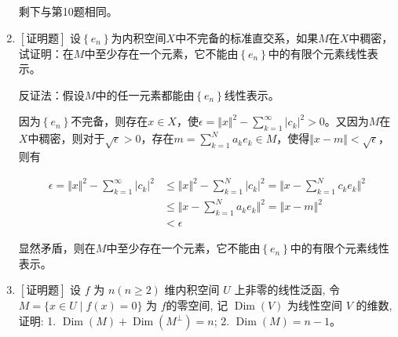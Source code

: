 \documentclass{article}
\begin{document}
\begin{enumerate}
    剩下与第10题相同。

    \item $\left[\textbf{证明题}\right]$ 设$\left\{e_n\right\}$为内积空间$X$中不完备的标准直交系，如果$M$在$X$中稠密，试证明：在$M$中至少存在一个元素，它不能由$\left\{e_n\right\}$中的有限个元素线性表示。

    反证法：假设$M$中的任一元素都能由$\left\{e_n\right\}$线性表示。

    因为$\left\{e_n\right\}$不完备，则存在$x \in X$，使$\epsilon = \Vert x \Vert ^ 2 - \sum_{k=1}^{\infty} \left|c_k\right|^2 > 0$。又因为$M$在$X$中稠密，则对于$\sqrt{\epsilon} > 0$，存在$m=\sum_{k=1}^{N} a_ke_k \in M$，使得$\Vert x - m\Vert < \sqrt{\epsilon}$，则有

    \begin{equation*}
        \begin{aligned}
            \epsilon = \Vert x \Vert ^ 2 - \sum_{k=1}^{\infty} \left|c_k\right|^2 & \leq \Vert x \Vert ^ 2 - \sum_{k=1}^{N} \left|c_k\right|^2 = \Vert x- \sum_{k=1}^{N}c_k e_k \Vert ^ 2 \\ &\leq \Vert x- \sum_{k=1}^{N}a_k e_k \Vert ^ 2 = \Vert x- m \Vert ^ 2 \\
            &< \epsilon
        \end{aligned}
    \end{equation*}

显然矛盾，则在$M$中至少存在一个元素，它不能由$\left\{e_n\right\}$中的有限个元素线性表示。

\item $\left[\textbf{证明题}\right]$ 设 $f$ 为 $n(n \geq 2)$ 维内积空间 $U$ 上非零的线性泛函, 令 $M=\{x \in U \mid f(x)=0\}$ 为 $f$的零空间, 记 $\operatorname{Dim}(V)$ 为线性空间 $V$ 的维数, 证明: 1. $\operatorname{Dim}(M)+\operatorname{Dim}\left(M^{\perp}\right)=n$;
2. $\operatorname{Dim}(M)=n-1$。

\end{enumerate}

% 



\end{document}
